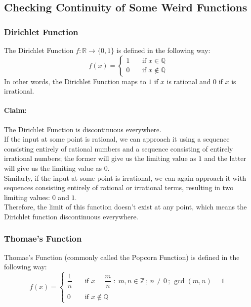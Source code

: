 \documentclass[14]{article}
\theoremstyle{definition}
\theoremstyle{case}
\begin{document}
\subsection{Checking Continuity of Some Weird Functions}
\subsubsection{Dirichlet Function}
The Dirichlet Function $f:\mathbb{R}\to \{0, 1\}$ is defined in the following way:
\[
f\left(x\right) = \left\{
        \begin{array}{ll}
            1 & \quad \text{if } x \in \mathbb{Q} \\
            0 & \quad \text{if } x \notin \mathbb{Q}
        \end{array}
    \right.
\]
In other words, the Dirichlet Function maps to $1$ if $x$ is rational and $0$ if $x$ is irrational.\\
\paragraph{Claim:} The Dirichlet Function is discontinuous everywhere.\\
If the input at some point is rational, we can approach it using a sequence consisting entirely of rational numbers and a sequence consisting of entirely irrational numbers; the former will give us the limiting value as $1$ and the latter will give us the limiting value as $0$.\\
Similarly, if the input at some point is irrational, we can again approach it with sequences consisting entirely of rational or irrational terms, resulting in two limiting values: $0$ and $1$.\\
Therefore, the limit of this function doesn't exist at any point, which means the Dirichlet function discontinuous everywhere.
\subsubsection{Thomae's Function}
Thomae's Function (commonly called the Popcorn Function) is defined in the following way:\\
\[
f\left(x\right) = \left\{
        \begin{array}{ll}
            \dfrac{1}{n} & \quad \text{if } x = \dfrac{m}{n}\; : \; m, n \in \mathbb{Z}\,;\, n \neq 0\,;\, \gcd (m, n) = 1  \\\\
            0 & \quad \text{if } x \notin \mathbb{Q}
        \end{array}
    \right.
\]
\end{document}
